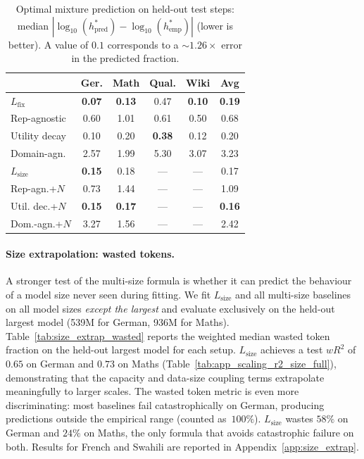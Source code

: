 \begin{table}[h]
\centering
\caption{Optimal mixture prediction on held-out test steps: median $|\log_{10}(h^*_\text{pred}) - \log_{10}(h^*_\text{emp})|$ (lower is better). A value of $0.1$ corresponds to a ${\sim}1.26\times$ error in the predicted fraction.}
\label{tab:app_hstar_error}
\small
\begin{tabular}{lccccc}
\toprule
& Ger. & Math & Qual. & Wiki & Avg \\
\midrule
$L_\mathrm{fix}$ & \textbf{0.07} & \textbf{0.13} & 0.47 & \textbf{0.10} & \textbf{0.19} \\
Rep-agnostic & 0.60 & 1.01 & 0.61 & 0.50 & 0.68 \\
Utility decay & 0.10 & 0.20 & \textbf{0.38} & 0.12 & 0.20 \\
Domain-agn. & 2.57 & 1.99 & 5.30 & 3.07 & 3.23 \\
\midrule
$L_\mathrm{size}$ & \textbf{0.15} & 0.18 & --- & --- & 0.17 \\
Rep-agn.+$N$ & 0.73 & 1.44 & --- & --- & 1.09 \\
Util. dec.+$N$ & \textbf{0.15} & \textbf{0.17} & --- & --- & \textbf{0.16} \\
Dom.-agn.+$N$ & 3.27 & 1.56 & --- & --- & 2.42 \\
\bottomrule
\end{tabular}
\end{table}

\paragraph{Size extrapolation: wasted tokens.}
A stronger test of the multi-size formula is whether it can predict the behaviour of a model size never seen during fitting. We fit $L_\mathrm{size}$ and all multi-size baselines on all model sizes \emph{except the largest} and evaluate exclusively on the held-out largest model (539M for German, 936M for Maths). Table~\ref{tab:size_extrap_wasted} reports the weighted median wasted token fraction on the held-out largest model for each setup.
$L_\mathrm{size}$ achieves a test $wR^2$ of $0.65$ on German and $0.73$ on Maths (Table~\ref{tab:app_scaling_r2_size_full}), demonstrating that the capacity and data-size coupling terms extrapolate meaningfully to larger scales.
The wasted token metric is even more discriminating: most baselines fail catastrophically on German, producing predictions outside the empirical range (counted as~$100\%$).
$L_\mathrm{size}$ wastes $58\%$ on German and $24\%$ on Maths, the only formula that avoids catastrophic failure on both.
Results for French and Swahili are reported in Appendix~\ref{app:size_extrap}.

